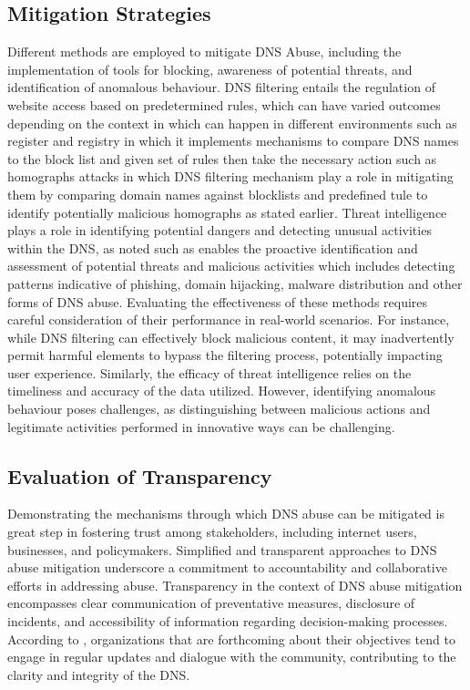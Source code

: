 \subsection{Mitigation Strategies}

Different methods are employed to mitigate DNS Abuse, including the implementation of tools for blocking, awareness of potential threats, and identification of anomalous behaviour. DNS filtering entails the regulation of website access based on predetermined rules, which can have varied outcomes depending on the context in which can happen in different environments such as register and registry in which it implements mechanisms to compare DNS names to the block list and given set of rules then take the necessary action such as homographs attacks in which DNS filtering mechanism play a role in mitigating them by comparing domain names against blocklists and predefined tule to identify potentially malicious homographs as stated earlier. Threat intelligence plays a role in identifying potential dangers and detecting unusual activities within the DNS, as noted \cite{rizvi2022application} such as enables the proactive identification and assessment of potential threats and malicious activities which includes detecting patterns indicative of phishing, domain hijacking, malware distribution and other forms of DNS abuse. Evaluating the effectiveness of these methods requires careful consideration of their performance in real-world scenarios. For instance, while DNS filtering can effectively block malicious content, it may inadvertently permit harmful elements to bypass the filtering process, potentially impacting user experience. Similarly, the efficacy of threat intelligence relies on the timeliness and accuracy of the data utilized. However, identifying anomalous behaviour poses challenges, as distinguishing between malicious actions and legitimate activities performed in innovative ways can be challenging.

\subsection{Evaluation of Transparency}

Demonstrating the mechanisms through which DNS abuse can be mitigated is great step in fostering trust among stakeholders, including internet users, businesses, and policymakers. Simplified and transparent approaches to DNS abuse mitigation underscore a commitment to accountability and collaborative efforts in addressing abuse. Transparency in the context of DNS abuse mitigation encompasses clear communication of preventative measures, disclosure of incidents, and accessibility of information regarding decision-making processes. According to \cite{chaganti2023survey}, organizations that are forthcoming about their objectives tend to engage in regular updates and dialogue with the community, contributing to the clarity and integrity of the DNS.

